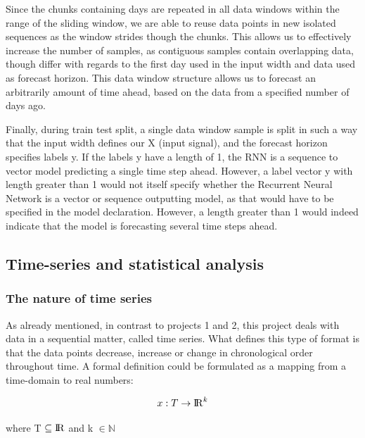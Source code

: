 \documentclass
[twocolumn,
secnumarabic,
nobibnotes,
aps,
prl,
reprint,
groupedaddress,
amsmath,
amssymb,
]{revtex4-2}
\begin{document}
Since the chunks containing days are repeated in all data windows within the range of the sliding window, we are able to reuse data points in new isolated sequences as the window strides though the chunks. This allows us to effectively increase the number of samples, as contiguous samples contain overlapping data, though differ with regards to the first day used in the input width and data used as forecast horizon. This data window structure allows us to forecast an arbitrarily amount of time ahead, based on the data from a specified number of days ago.

Finally, during train test split, a single data window sample is split in such a way that the input width defines our X (input signal), and the forecast horizon specifies labels y. If the labels y have a length of 1, the RNN is a sequence to vector model predicting a single time step ahead. However, a label vector y with length greater than 1 would not itself specify whether the Recurrent Neural Network is a vector or sequence outputting model, as that would have to be specified in the model declaration. However, a length greater than 1 would indeed indicate that the model is forecasting several time steps ahead. 

\subsection{Time-series and statistical analysis}

\subsubsection{The nature of time series}
As already mentioned, in contrast to projects 1 and 2, this project deals with data in a sequential matter, called time series. What defines this type of format is that the data points decrease, increase or change in chronological order throughout time\cite{Vishwas2020}. A formal definition could be formulated as a mapping from a time-domain to real numbers:

\begin{equation}
  x: T \rightarrow {\rm I\!R}^k 
\end{equation}

where T $\subseteq {\rm I\!R}$ and k $\in \mathbb{N}$ \cite{Auffarth2021}
\end{document}
